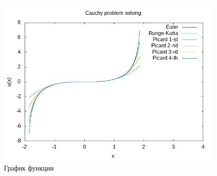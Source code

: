 \captionsetup{singlelinecheck = false, justification=centering}
\begin{center}
	\begin{figure}[H]
		\centering
		\includegraphics[width=0.9\linewidth]{assets/plot.png}
		\caption{График функции}
	\end{figure}
\end{center}

